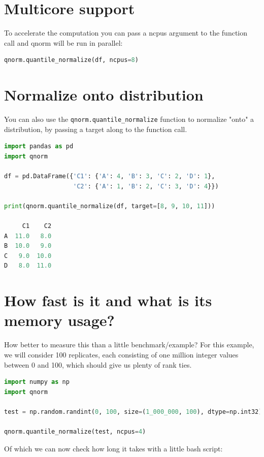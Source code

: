 \section{Multicore support}

To accelerate the computation you can pass a ncpus argument to the function call and qnorm will be run in parallel:

\begin{lstlisting}[language=Python]
qnorm.quantile_normalize(df, ncpus=8)  
\end{lstlisting}

\section{Normalize onto distribution}

You can also use the \lstinline[language=Python]{qnorm.quantile_normalize} function to normalize "onto" a distribution, by passing a target along to the function call.

\begin{lstlisting}[language=Python]
import pandas as pd
import qnorm

df = pd.DataFrame({'C1': {'A': 4, 'B': 3, 'C': 2, 'D': 1},
                   'C2': {'A': 1, 'B': 2, 'C': 3, 'D': 4}})

print(qnorm.quantile_normalize(df, target=[8, 9, 10, 11]))

     C1    C2
A  11.0   8.0
B  10.0   9.0
C   9.0  10.0
D   8.0  11.0
\end{lstlisting}

\section{How fast is it and what is its memory usage?}

How better to measure this than a little benchmark/example? For this example, we will consider 100 replicates, each consisting of one million integer values between 0 and 100, which should give us plenty of rank ties.

\begin{lstlisting}[language=Python]
import numpy as np
import qnorm

test = np.random.randint(0, 100, size=(1_000_000, 100), dtype=np.int32)

qnorm.quantile_normalize(test, ncpus=4)
\end{lstlisting}

Of which we can now check how long it takes with a little bash script:


